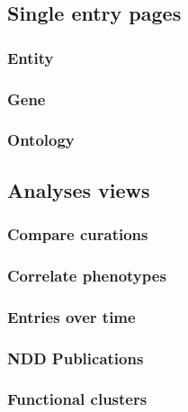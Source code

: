 \documentclass[
]{article}
\begin{document}
\hypertarget{single-entry-pages}{%
\subsection{Single entry pages}\label{single-entry-pages}}

\hypertarget{entity}{%
\subsubsection{Entity}\label{entity}}

\hypertarget{gene}{%
\subsubsection{Gene}\label{gene}}

\hypertarget{ontology}{%
\subsubsection{Ontology}\label{ontology}}

\hypertarget{analyses-views}{%
\subsection{Analyses views}\label{analyses-views}}

\hypertarget{compare-curations}{%
\subsubsection{Compare curations}\label{compare-curations}}

\hypertarget{correlate-phenotypes}{%
\subsubsection{Correlate phenotypes}\label{correlate-phenotypes}}

\hypertarget{entries-over-time}{%
\subsubsection{Entries over time}\label{entries-over-time}}

\hypertarget{ndd-publications}{%
\subsubsection{NDD Publications}\label{ndd-publications}}

\hypertarget{functional-clusters}{%
\subsubsection{Functional clusters}\label{functional-clusters}}
\end{document}
